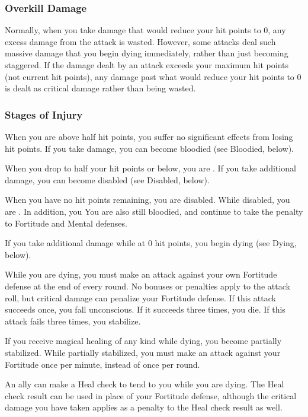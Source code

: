 \subsubsection{Overkill Damage}
Normally, when you take damage that would reduce your hit points to 0, any excess damage from the attack is wasted. However, some attacks deal such massive damage that you begin dying immediately, rather than just becoming staggered. If the damage dealt by an attack exceeds your maximum hit points (not current hit points), any damage past what would reduce your hit points to 0 is dealt as critical damage rather than being wasted.

\subsubsection{Stages of Injury}

 When you are above half hit points, you suffer no significant effects from losing hit points. If you take damage, you can become bloodied (see Bloodied, below).

 When you drop to half your hit points or below, you are \bloodied. If you take additional damage, you can become disabled (see Disabled, below).

 When you have no hit points remaining, you are disabled. While disabled, you are \staggered. In addition, you  You are also still bloodied, and continue to take the  penalty to Fortitude and Mental defenses.

If you take additional damage while at 0 hit points, you begin dying (see Dying, below).

\label{Dying} While you are dying, you must make an attack against your own Fortitude defense at the end of every round. No bonuses or penalties apply to the attack roll, but critical damage can penalize your Fortitude defense. If this attack succeeds once, you fall unconscious. If it succeeds three times, you die. If this attack fails three times, you stabilize.

If you receive magical healing of any kind while dying, you become partially stabilized. While partially stabilized, you must make an attack against your Fortitude once per minute, instead of once per round.

An ally can make a Heal check to tend to you while you are dying. The Heal check result can be used in place of your Fortitude defense, although the critical damage you have taken applies as a penalty to the Heal check result as well.

